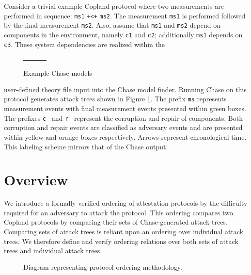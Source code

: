 \documentclass[runningheads]{llncs}
\theoremstyle{definition}
\begin{document}
Consider a trivial example Copland protocol where two measurements are
performed in sequence: \texttt{ms1} \texttt{+<+} \texttt{ms2}.  The
measurement \texttt{ms1} is performed followed by the final
measurement \texttt{ms2}. Also, assume that \texttt{ms1} and
\texttt{ms2} depend on components in the environment, namely
\texttt{c1} and \texttt{c2}; additionally \texttt{ms1} depends on
\texttt{c3}. These system dependencies are realized within the
\begin{figure}[h]
  \centering 
  \begin{tabular}{m{3cm} m{3cm} m{3cm}}
       &  &  
  \end{tabular}
  \caption[Example Chase Models]{Example Chase models}
  \label{fig:chase-ex}
\end{figure}
user-defined theory file input into the Chase model finder. Running
Chase on this protocol generates attack trees shown in Figure
\ref{fig:chase-ex}. The prefix \texttt{ms} represents measurement
events with final measurement events presented within green boxes. The
prefixes \texttt{c\_} and \texttt{r\_} represent the corruption and
repair of components. Both corruption and repair events are classified
as adversary events and are presented within yellow and orange boxes
respectively. Arrows represent chronological time. This
labeling scheme mirrors that of the Chase output.



\section{Overview}
We introduce a formally-verified ordering of attestation protocols by
the difficulty required for an adversary to attack the protocol. This
ordering compares two Copland protocols by comparing their sets of
Chase-generated attack trees. Comparing sets of attack trees is
reliant upon an ordering over individual attack trees.  We therefore
define and verify ordering relations over both sets of attack trees
and individual attack trees.

\begin{figure}[hbtp]
    \centering
    \captionsetup{justification=centering,margin=1cm}
    
    \caption[Protocol ordering abstraction]{Diagram representing protocol ordering methodology. }
    \label{fig:protocol-org-fig}
\end{figure}
\end{document}
